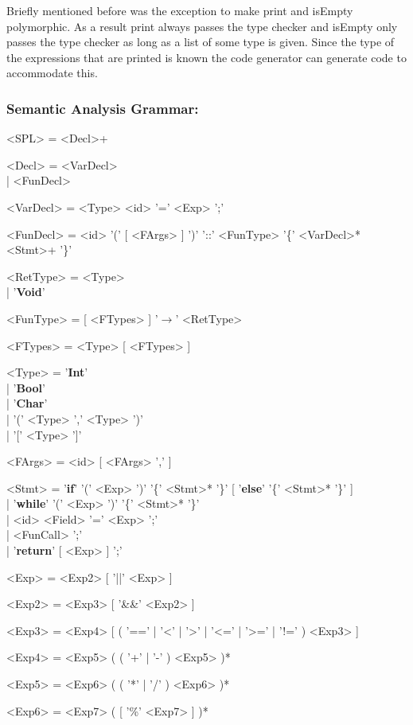 \documentclass{article}
\begin{document}
Briefly mentioned before was the exception to make print and isEmpty polymorphic. As a result print always passes the type checker and isEmpty only passes the type checker as long as a list of some type is given. Since the type of the expressions that are printed is known the code generator can generate code to accommodate this.

\subsubsection*{Semantic Analysis Grammar:}
\begin{grammar}
	<SPL> = <Decl>+

	<Decl> = <VarDecl> \\| <FunDecl>

	<VarDecl> = <Type> <id> '=' <Exp> ';'

	<FunDecl> = <id> '(' [ <FArgs> ] ')' '::' <FunType> '\{' <VarDecl>* <Stmt>+ '\}'

	<RetType> = <Type> \\| '\textbf{Void}'

	<FunType> = [ <FTypes> ] '$\rightarrow$' <RetType>

	<FTypes> = <Type> [ <FTypes> ]

	<Type> = '\textbf{Int}' \\| '\textbf{Bool}' \\| '\textbf{Char}' \\| '(' <Type> ',' <Type> ')' \\| '[' <Type> ']'

	<FArgs> = <id> [ <FArgs> ',' ]

	<Stmt> = '\textbf{if}' '(' <Exp> ')' '\{' <Stmt>* '\}' [ '\textbf{else}' '\{' <Stmt>* '\}' ] \\| '\textbf{while}' '(' <Exp> ')' '\{' <Stmt>* '\}' \\| <id> <Field> '=' <Exp> ';' \\| <FunCall> ';' \\| '\textbf{return}' [ <Exp> ] ';'

	<Exp> = <Exp2> [ '||' <Exp> ]

	<Exp2> = <Exp3> [ '\&\&' <Exp2> ]

	<Exp3> = <Exp4> [ ( '==' | '\textless' | '\textgreater' | '\textless=' | '\textgreater=' | '!=' ) <Exp3> ]

	<Exp4> = <Exp5> ( ( '+' | '-' ) <Exp5> )*

	<Exp5> = <Exp6> ( ( '*' | '/' ) <Exp6> )*

	<Exp6> = <Exp7> ( [ '\%' <Exp7> ] )*


\end{grammar}
\end{document}
